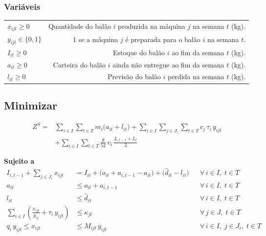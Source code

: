 \documentclass[fleqn,12pt,a4paper]{article}
\begin{document}
\subsubsection*{Variáveis}
\begin{tabularx}{\linewidth}{@{}L{2.8cm}R@{}}
$x_{ijt} \ge 0$ & Quantidade do balão $i$ produzida na máquina $j$ na semana $t$ (kg).\\
$y_{ijt} \in \{0,1\}$ & 1 se a máquina $j$ é preparada para o balão $i$ na semana $t$.\\
$I_{it} \ge 0$ & Estoque do balão $i$ ao fim da semana $t$ (kg).\\
$a_{it} \ge 0$ & Carteira do balão $i$ ainda não entregue ao fim da semana $t$ (kg).\\
$l_{it} \ge 0$ & Previsão do balão $i$ perdida na semana $t$ (kg).\\
\end{tabularx}

\subsection*{\textbf{Minimizar}}
\begin{ceqn}
\begin{equation}
\begin{aligned}
Z^{S} = {} & \sum_{i \in I}\sum_{t \in T} m_{i} \bigl( a_{it} + l_{it} \bigr)
    + \sum_{i \in I}\sum_{j \in J_i}\sum_{t \in T} c_{j}\, \tau_{i}\, y_{ijt} \\
    & + \sum_{i \in I}\sum_{t \in T} \frac{\theta}{52}\, v_{i}\, \frac{I_{i,t-1} + I_{it}}{2}
\end{aligned}
\label{eq:obj_semanal}
\end{equation}
\end{ceqn}

\noindent\textbf{Sujeito a}
\begin{align}
I_{i,t-1} + \sum_{j \in J_i} x_{ijt}
    &= I_{it} + \bigl(o_{it} + a_{i,t-1} - a_{it}\bigr) + \bigl(\hat{d}_{it} - l_{it}\bigr)
    && \forall\, i \in I,\; t \in T \label{eq:balanco_semanal} \\
a_{it} &\le o_{it} + a_{i,t-1}
    && \forall\, i \in I,\; t \in T \label{eq:atraso_limite} \\
l_{it} &\le \hat{d}_{it}
    && \forall\, i \in I,\; t \in T \label{eq:perda_limite} \\
\sum_{i \in I} \left( \frac{x_{ijt}}{p_{ij}} + \tau_{i}\, y_{ijt} \right)
    &\le \kappa_{jt}
    && \forall\, j \in J,\; t \in T \label{eq:capacidade_semanal} \\
q_{i}\, y_{ijt} \le x_{ijt} &\le M_{ijt}\, y_{ijt}
    && \forall\, i \in I,\; j \in J_i,\; t \in T \label{eq:lote_minimo}
\end{align}
\end{document}
